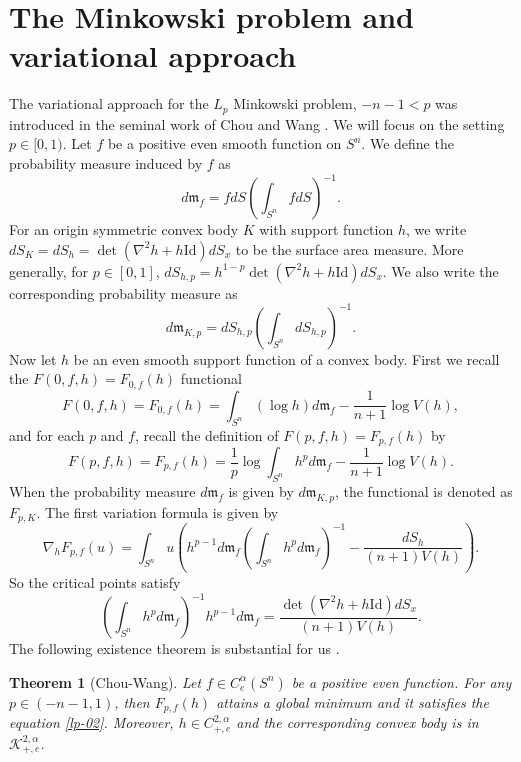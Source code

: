\documentclass[reqno]{amsart}
\theoremstyle{remark}
\def\cK{{\mathcal K}}
\theoremstyle{plain}
\newtheorem{thm}{Theorem}
\begin{document}
\section{The Minkowski problem and variational approach}
The variational approach for the $L_p$ Minkowski problem, $-n-1<p$ was introduced in the seminal work of Chou and Wang \cite{CW06}.
We will focus on the setting $p\in [0, 1)$. 
Let $f$ be a positive even smooth function on $S^n$. 
We define the probability measure induced by $f$ as \[d\mathfrak{m}_f=f dS \left(\int_{S^{n}} fdS\right)^{-1}.\]
For an origin symmetric convex body $K$ with support function $h$, 
we write $dS_K=dS_h=\det(\nabla^2h+h\text{Id})dS_x$ to be the surface area measure.
More generally, for $p\in [0, 1]$, $dS_{h, p}=h^{1-p}\det(\nabla^2 h+h\text{Id})dS_x$. We also write the corresponding probability measure as
\[
d\mathfrak{m}_{K, p}=dS_{h, p} \left(\int_{S^n} dS_{h, p}\right)^{-1}. 
\]
Now let $h$ be an even smooth support function of a convex body. 
First we recall the $F(0, f, h)=F_{0, f}(h)$ functional 
\begin{equation}
   F(0, f, h)=F_{0, f}(h)=\int_{S^{n}} (\log {h})d\mathfrak{m}_f-\frac{1}{n+1}\log V(h),
\end{equation}
and for each $p$ and $f$, recall the definition of $F(p, f, h)=F_{p ,f}(h)$ by
\begin{equation}
F(p, f, h)=F_{p, f}(h)=\frac{1}{p}\log\int_{S^{n}} h^p d\mathfrak{m}_f-\frac{1}{n+1} \log V(h).
\end{equation}
When the probability measure $d\mathfrak{m}_f$ is given by $d\mathfrak{m}_{K, p}$, the functional is denoted as $F_{p, K}$.
The first variation formula is given by \begin{equation}\label{1stvariation-01}
\nabla_h F_{p, f}(u)=\int_{S^n} u\left(h^{p-1}d\mathfrak{m}_f\left({\int_{S^n}h^pd\mathfrak{m}_f}\right)^{-1}-\frac{dS_h}{(n+1)V(h)}\right).
\end{equation}
So the critical points satisfy 
\begin{equation}\label{lp-02}
\left({\displaystyle\int_{S^{n}}h^{p} d\mathfrak{m}_f}\right)^{-1}h^{p-1} d\mathfrak{m}_f=\frac{\det(\nabla^2 h+h \text{Id})dS_x}{(n+1)V(h)}.    
\end{equation}
The following existence theorem is substantial for us \cite[Theorem D, Section 5]{CW06}.
\begin{thm}
    [Chou-Wang]Let $f\in C^\alpha_e(S^n)$ be a positive even function. For any $p\in (-n-1, 1)$, then $F_{p, f}(h)$ attains a global minimum and it satisfies the equation \eqref{lp-02}. Moreover, $h\in C^{2, \alpha}_{+, e}$ and the corresponding convex body  is in $\cK^{2, \alpha}_{+, e}$. 
\end{thm}
\end{document}

